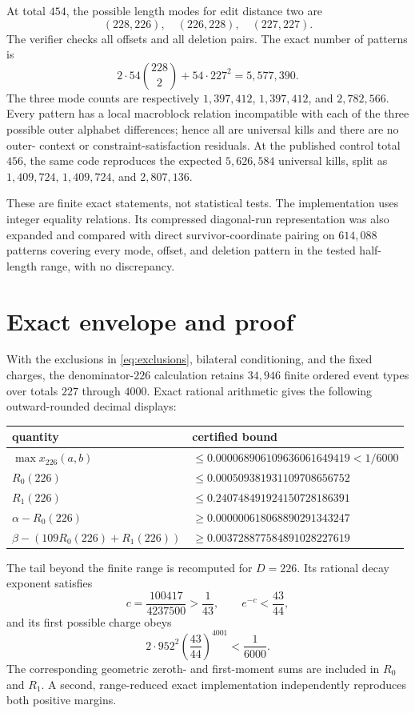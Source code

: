 \documentclass[11pt]{article}
\begin{document}
At total $454$, the possible length modes for edit distance two are
\[
                 (228,226),\quad(226,228),\quad(227,227).
\]
The verifier checks all offsets and all deletion pairs.  The exact number of
patterns is
\[
  2\cdot54\binom{228}{2}+54\cdot227^2=5{,}577{,}390.
\]
The three mode counts are respectively
$1{,}397{,}412$, $1{,}397{,}412$, and $2{,}782{,}566$.  Every pattern has a
local macroblock relation incompatible with each of the three possible outer
alphabet differences; hence all are universal kills and there are no outer-
context or constraint-satisfaction residuals.  At the published control total
$456$, the same code reproduces the expected $5{,}626{,}584$ universal kills,
split as $1{,}409{,}724$, $1{,}409{,}724$, and $2{,}807{,}136$.

These are finite exact statements, not statistical tests.  The implementation
uses integer equality relations.  Its compressed diagonal-run representation
was also expanded and compared with direct survivor-coordinate pairing on
$614{,}088$ patterns covering every mode, offset, and deletion pattern in the
tested half-length range, with no discrepancy.

\section{Exact envelope and proof}

With the exclusions in \eqref{eq:exclusions}, bilateral conditioning, and the
fixed charges, the denominator-$226$ calculation retains $34{,}946$ finite
ordered event types over totals $227$ through $4000$.  Exact rational
arithmetic gives the following outward-rounded decimal displays:
\begin{center}
\begin{tabular}{@{}ll@{}}
\toprule
quantity & certified bound \\
\midrule
$\max x_{226}(a,b)$ & $\leq0.000068906109636061649419<1/6000$ \\
$R_0(226)$ & $\leq0.000509381931109708656752$ \\
$R_1(226)$ & $\leq0.240748491924150728186391$ \\
$\alpha-R_0(226)$ & $\geq0.000000618068890291343247$ \\
$\beta-(109R_0(226)+R_1(226))$
 & $\geq0.003728877584891028227619$ \\
\bottomrule
\end{tabular}
\end{center}
The tail beyond the finite range is recomputed for $D=226$.  Its rational
decay exponent satisfies
\[
      c=\frac{100417}{4237500}>\frac1{43},
      \qquad e^{-c}<\frac{43}{44},
\]
and its first possible charge obeys
\[
             2\cdot952^2\left(\frac{43}{44}\right)^{4001}<\frac1{6000}.
\]
The corresponding geometric zeroth- and first-moment sums are included in
$R_0$ and $R_1$.  A second, range-reduced exact implementation independently
reproduces both positive margins.
\end{document}
